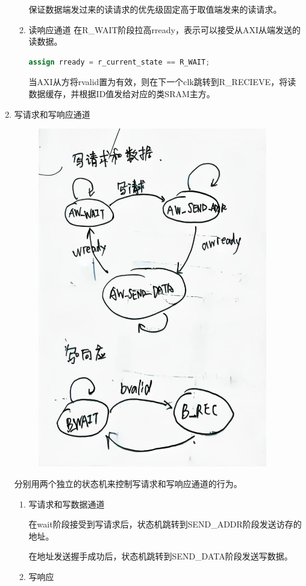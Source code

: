 \documentclass[11pt]{article}
\begin{document}
\begin{enumerate}
\begin{enumerate}
    保证数据端发过来的读请求的优先级固定高于取值端发来的读请求。
  \item 读响应通道
  在R\_WAIT阶段拉高rready，表示可以接受从AXI从端发送的读数据。
  \begin{lstlisting}[language=verilog]
  assign rready = r_current_state == R_WAIT;
  \end{lstlisting}
  当AXI从方将rvalid置为有效，则在下一个clk跳转到R_RECIEVE，将读数据缓存，并根据ID值发给对应的类SRAM主方。
\end{enumerate}
\item 写请求和写响应通道
\begin{figure}[H]
  \centering
  \includegraphics[width=10cm]{fig/fig5.jpg}
\end{figure}
分别用两个独立的状态机来控制写请求和写响应通道的行为。
\begin{enumerate}
  \item 写请求和写数据通道

  在wait阶段接受到写请求后，状态机跳转到SEND\_ADDR阶段发送访存的地址。
  
  在地址发送握手成功后，状态机跳转到SEND\_DATA阶段发送写数据。

  \item 写响应
  

\end{enumerate}
\end{enumerate}
\end{document}
